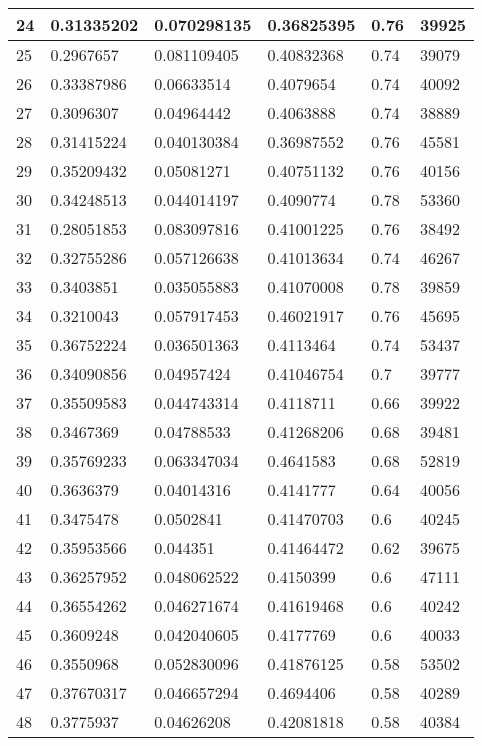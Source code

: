 \begin{longtable}{|l|l|l|l|l|l|}
24 & 0.31335202 & 0.070298135 & 0.36825395 & 0.76 & 39925 \\ \hline 
25 & 0.2967657 & 0.081109405 & 0.40832368 & 0.74 & 39079 \\ \hline 
26 & 0.33387986 & 0.06633514 & 0.4079654 & 0.74 & 40092 \\ \hline 
27 & 0.3096307 & 0.04964442 & 0.4063888 & 0.74 & 38889 \\ \hline 
28 & 0.31415224 & 0.040130384 & 0.36987552 & 0.76 & 45581 \\ \hline 
29 & 0.35209432 & 0.05081271 & 0.40751132 & 0.76 & 40156 \\ \hline 
30 & 0.34248513 & 0.044014197 & 0.4090774 & 0.78 & 53360 \\ \hline 
31 & 0.28051853 & 0.083097816 & 0.41001225 & 0.76 & 38492 \\ \hline 
32 & 0.32755286 & 0.057126638 & 0.41013634 & 0.74 & 46267 \\ \hline 
33 & 0.3403851 & 0.035055883 & 0.41070008 & 0.78 & 39859 \\ \hline 
34 & 0.3210043 & 0.057917453 & 0.46021917 & 0.76 & 45695 \\ \hline 
35 & 0.36752224 & 0.036501363 & 0.4113464 & 0.74 & 53437 \\ \hline 
36 & 0.34090856 & 0.04957424 & 0.41046754 & 0.7 & 39777 \\ \hline 
37 & 0.35509583 & 0.044743314 & 0.4118711 & 0.66 & 39922 \\ \hline 
38 & 0.3467369 & 0.04788533 & 0.41268206 & 0.68 & 39481 \\ \hline 
39 & 0.35769233 & 0.063347034 & 0.4641583 & 0.68 & 52819 \\ \hline 
40 & 0.3636379 & 0.04014316 & 0.4141777 & 0.64 & 40056 \\ \hline 
41 & 0.3475478 & 0.0502841 & 0.41470703 & 0.6 & 40245 \\ \hline 
42 & 0.35953566 & 0.044351 & 0.41464472 & 0.62 & 39675 \\ \hline 
43 & 0.36257952 & 0.048062522 & 0.4150399 & 0.6 & 47111 \\ \hline 
44 & 0.36554262 & 0.046271674 & 0.41619468 & 0.6 & 40242 \\ \hline 
45 & 0.3609248 & 0.042040605 & 0.4177769 & 0.6 & 40033 \\ \hline 
46 & 0.3550968 & 0.052830096 & 0.41876125 & 0.58 & 53502 \\ \hline 
47 & 0.37670317 & 0.046657294 & 0.4694406 & 0.58 & 40289 \\ \hline 
48 & 0.3775937 & 0.04626208 & 0.42081818 & 0.58 & 40384 \\ \hline 

\end{longtable}
